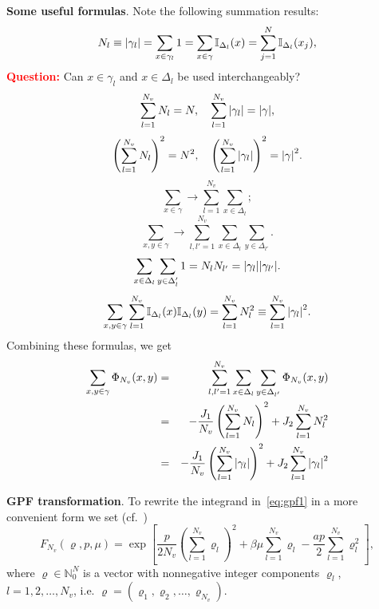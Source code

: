 \documentclass[12pt]{article}
\numberwithin{equation}{section}
\begin{document}
	\textbf{Some useful formulas}. Note the following summation results:
	\begin{equation}
		\label{eq:1}
		N_l \equiv \abs{\gamma_l} = \sum_{x \in \gamma_l} 1 = \sum_{x \in \gamma} \mathbb{I}_{\Delta_l}(x) = \sum_{j=1}^{N} \mathbb{I}_{\Delta_{l}}(x_j),
	\end{equation}
	\textbf{\textcolor{Red}{Question:}} Can $x \in \gamma_l$ and $x \in \Delta_l$ be used interchangeably?
	\begin{equation}
		\label{eq:2}
		\sum_{l=1}^{N_v} N_l = N, \quad \sum_{l=1}^{N_v} \abs{\gamma_l} = \abs{\gamma},
	\end{equation}
	\begin{equation}
		\label{eq:3}
		\left(\sum_{l=1}^{N_v} N_l \right)^2 = N^2, \quad \left(\sum_{l=1}^{N_v} \abs{\gamma_l} \right)^2 = \abs{\gamma}^2.
	\end{equation}
	\begin{equation}
		\label{eq:4}
		\sum_{x \in \gamma} \rightarrow \sum_{l=1}^{N_v} \sum_{x \in \Delta_l};
	\end{equation}
	\begin{equation}
		\label{eq:5}
		\sum_{x,y \in \gamma} \rightarrow \sum_{l,l'=1}^{N_v} \sum_{x \in \Delta_l} \sum_{y \in \Delta_{l'}}.
	\end{equation}
	\begin{equation}
		\label{eq:6}
		\sum_{x \in \Delta_l}\sum_{y \in \Delta_l'} 1 = N_l N_{l'} = \abs{\gamma_l} \abs{\gamma_{l'}}.
	\end{equation}
	\begin{equation}
		\label{eq:sumII}
		\sum_{x,y \in \gamma}\sum_{l=1}^{N_v} \mathbb{I}_{\Delta_l}(x) \mathbb{I}_{\Delta_{l}}(y) = \sum_{l=1}^{N_v} N_l^2 \equiv \sum_{l=1}^{N_v} \abs{\gamma_l}^2.
	\end{equation}
	Combining these formulas, we get
	\begin{eqnarray}
		\sum_{x,y \in \gamma} \Phi_{N_v}(x,y) & = & \sum_{l,l'=1}^{N_v} \sum_{x \in \Delta_l} \sum_{y \in \Delta_{l'}} \Phi_{N_v}(x,y)
		\nonumber\\
		& = & - \frac{J_1}{N_v} \left(\sum_{l=1}^{N_v} N_l\right)^2 + J_2\sum_{l=1}^{N_v}N_l^2
		\\
		& = & - \frac{J_1}{N_v} \left(\sum_{l=1}^{N_v} \abs{\gamma_l}\right)^2 + J_2\sum_{l=1}^{N_v}\abs{\gamma_l}^2
	\end{eqnarray}
	
	\textbf{GPF transformation}. To rewrite the integrand in~\eqref{eq:gpf1} in a more convenient form we set (cf.~\cite[eq.~(2.7)]{KKD20})
	\begin{equation}
		F_{N_v}(\varrho, p, \mu) = \exp[\frac{p}{2N_v}\left(\sum_{l=1}^{N_v} \varrho_l\right)^2 + \beta\mu\sum_{l=1}^{N_v} \varrho_l - \frac{a p}{2} \sum_{l=1}^{N_v} \varrho_l^2],
	\end{equation}
	where $\varrho \in \mathbb{N}_0^N$ is a vector with nonnegative integer components $\varrho_l$, $l=1, 2, \ldots , N_v$, i.e. $\varrho = (\varrho_1, \varrho_2, \ldots, \varrho_{N_{v}})$.
	
\end{document}
